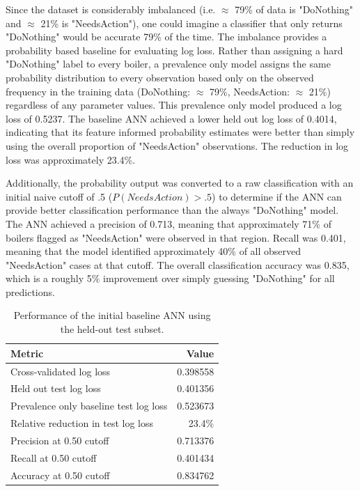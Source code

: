 \documentclass[NewProceedings,letterpaper,NoPageNumbers,NoLineNumbers, DoubleSpace]{ascelike-new}
\begin{document}
Since the dataset is considerably imbalanced (i.e. $\approx$ 79\% of data is "DoNothing" and $\approx$ 21\% is "NeedsAction"), one could imagine a classifier that only returns "DoNothing" would be accurate 79\% of the time.  The imbalance provides a probability based baseline for evaluating log loss. Rather than assigning a hard "DoNothing" label to every boiler, a prevalence only model assigns the same probability distribution to every observation based only on the observed frequency in the training data (DoNothing: $\approx$ 79\%, NeedsAction: $\approx$ 21\%) regardless of any parameter values. This prevalence only model produced a log loss of 0.5237. The baseline ANN achieved a lower held out log loss of 0.4014, indicating that its feature informed probability estimates were better than simply using the overall proportion of "NeedsAction" observations. The reduction in log loss was approximately 23.4\%.

Additionally, the probability output was converted to a raw classification with an initial naive cutoff of .5 ($P(NeedsAction) > .5$) to determine if the ANN can provide better classification performance than the always "DoNothing" model. The ANN achieved a precision of 0.713, meaning that approximately 71\% of boilers flagged as "NeedsAction" were observed in that region. Recall was 0.401, meaning that the model identified approximately 40\% of all observed "NeedsAction" cases at that cutoff. The overall classification accuracy was 0.835, which is a roughly 5\% improvement over simply guessing "DoNothing" for all predictions.

\begin{table}[htbp]
\centering
\caption{Performance of the initial baseline ANN using the held-out test subset.}
\label{tab:ann-baseline-performance}
\begin{tabular}{lr}
\hline
\textbf{Metric} & \textbf{Value} \\
\hline
Cross-validated log loss & 0.398558 \\
Held out test log loss & 0.401356 \\
Prevalence only baseline test log loss & 0.523673 \\
Relative reduction in test log loss & 23.4\% \\
Precision at 0.50 cutoff & 0.713376 \\
Recall at 0.50 cutoff & 0.401434 \\
Accuracy at 0.50 cutoff & 0.834762 \\
\hline
\end{tabular}
\end{table}
\end{document}
